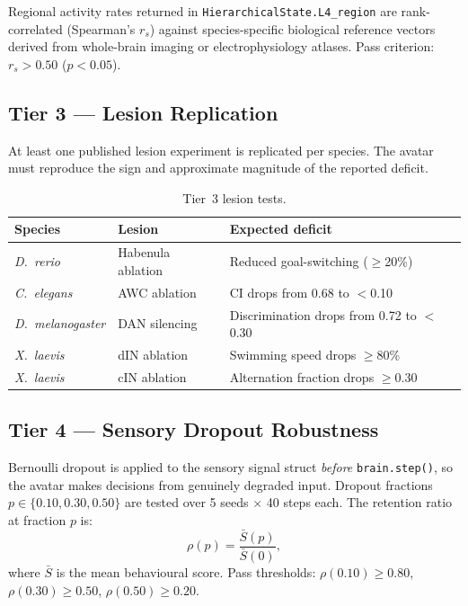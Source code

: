 \documentclass[11pt,a4paper]{article}
\begin{document}
Regional activity rates returned in \texttt{HierarchicalState.L4\_region}
are rank-correlated (Spearman's $r_s$) against species-specific
biological reference vectors derived from whole-brain imaging or
electrophysiology atlases.
Pass criterion: $r_s > 0.50$ ($p < 0.05$).

\subsection{Tier 3 — Lesion Replication}

At least one published lesion experiment is replicated per species.
The avatar must reproduce the sign and approximate magnitude of the
reported deficit.

\begin{table}[h]
\centering
\caption{Tier~3 lesion tests.}
\begin{tabular}{lll}
\toprule
Species & Lesion & Expected deficit \\
\midrule
\textit{D.\ rerio}         & Habenula ablation          & Reduced goal-switching ($\geq$20\%) \\
\textit{C.\ elegans}       & AWC ablation               & CI drops from 0.68 to $<$0.10 \\
\textit{D.\ melanogaster}  & DAN silencing              & Discrimination drops from 0.72 to $<$0.30 \\
\textit{X.\ laevis}        & dIN ablation               & Swimming speed drops $\geq$80\% \\
\textit{X.\ laevis}        & cIN ablation               & Alternation fraction drops $\geq$0.30 \\
\bottomrule
\end{tabular}
\end{table}

\subsection{Tier 4 — Sensory Dropout Robustness}

Bernoulli dropout is applied to the sensory signal struct
\emph{before} \texttt{brain.step()}, so the avatar makes decisions
from genuinely degraded input.
Dropout fractions $p \in \{0.10, 0.30, 0.50\}$ are tested over 5
seeds $\times$ 40 steps each.
The retention ratio at fraction $p$ is:
\[
  \rho(p) = \frac{\bar{S}(p)}{\bar{S}(0)},
\]
where $\bar{S}$ is the mean behavioural score.
Pass thresholds: $\rho(0.10) \geq 0.80$, $\rho(0.30) \geq 0.50$,
$\rho(0.50) \geq 0.20$.
\end{document}
